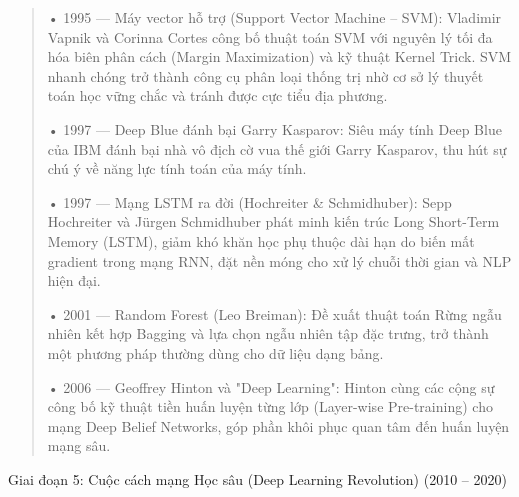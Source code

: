 \begin{quote}
• 1995 --- Máy vector hỗ trợ (Support Vector Machine -- SVM): Vladimir
Vapnik và Corinna Cortes công bố thuật toán SVM với nguyên lý tối đa hóa
biên phân cách (Margin Maximization) và kỹ thuật Kernel Trick. SVM nhanh
chóng trở thành công cụ phân loại thống trị nhờ cơ sở lý thuyết toán học
vững chắc và tránh được cực tiểu địa phương.

• 1997 --- Deep Blue đánh bại Garry Kasparov: Siêu máy tính Deep Blue
của IBM đánh bại nhà vô địch cờ vua thế giới Garry Kasparov, thu hút sự
chú ý về năng lực tính toán của máy tính.

• 1997 --- Mạng LSTM ra đời (Hochreiter \& Schmidhuber): Sepp Hochreiter
và Jürgen Schmidhuber phát minh kiến trúc Long Short-Term Memory (LSTM),
giảm khó khăn học phụ thuộc dài hạn do biến mất gradient trong mạng RNN,
đặt nền móng cho xử lý chuỗi thời gian và NLP hiện đại.

• 2001 --- Random Forest (Leo Breiman): Đề xuất thuật toán Rừng ngẫu
nhiên kết hợp Bagging và lựa chọn ngẫu nhiên tập đặc trưng, trở thành
một phương pháp thường dùng cho dữ liệu dạng bảng.

• 2006 --- Geoffrey Hinton và "Deep Learning": Hinton cùng các cộng sự
công bố kỹ thuật tiền huấn luyện từng lớp (Layer-wise Pre-training) cho
mạng Deep Belief Networks, góp phần khôi phục quan tâm đến huấn luyện
mạng sâu.
\end{quote}

Giai đoạn 5: Cuộc cách mạng Học sâu (Deep Learning Revolution) (2010 --
2020)

